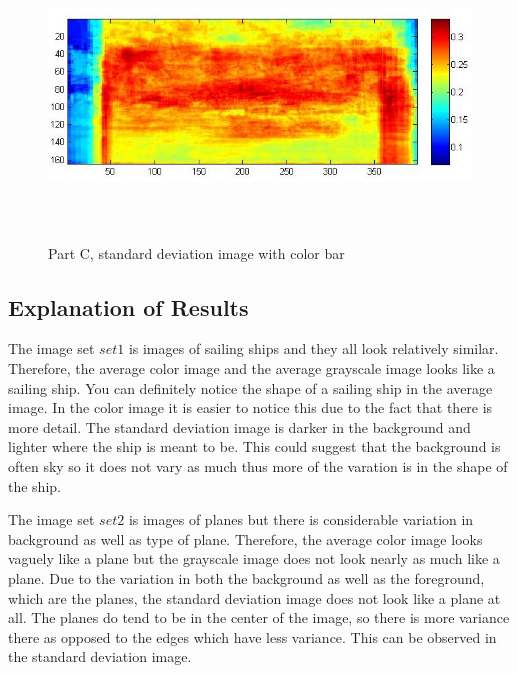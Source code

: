 \documentclass[11pt,psfig]{article}
\begin{document}
\begin{figure}[H]
\centering
\includegraphics[height=3in]{set2grayscaleStndDev_colorbar.jpg}
\caption{Part C, standard deviation image with color bar}
\end{figure}

\subsection*{Explanation of Results}

The image set $set1$ is images of sailing ships and they all look relatively similar. Therefore, the average color image and the average grayscale image looks like a sailing ship. You can definitely notice the shape of a sailing ship in the average image. In the color image it is easier to notice this due to the fact that there is more detail. The standard deviation image is darker in the background and lighter where the ship is meant to be. This could suggest that the background is often sky so it does not vary as much thus more of the varation is in the shape of the ship. 

The image set $set2$ is images of planes but there is considerable variation in background as well as type of plane. Therefore, the average color image looks vaguely like a plane but the grayscale image does not look nearly as much like a plane. Due to the variation in both the background as well as the foreground, which are the planes, the standard deviation image does not look like a plane at all. The planes do tend to be in the center of the image, so there is more variance there as opposed to the edges which have less variance. This can be observed in the standard deviation image. 
\end{document}
